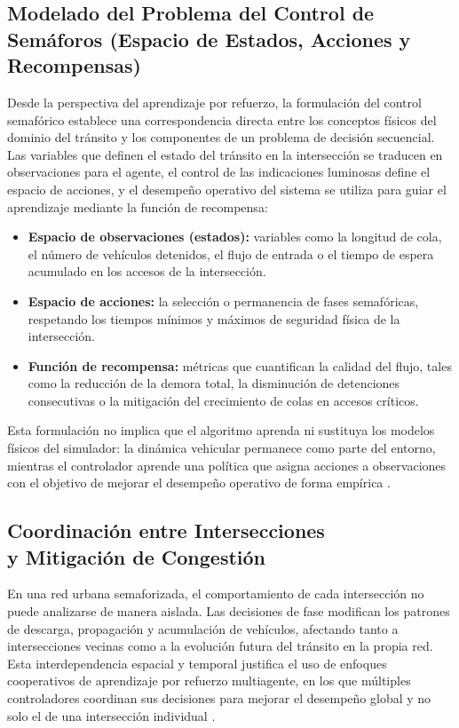 \subsection{Modelado del Problema del Control de Semáforos (Espacio de Estados, Acciones y Recompensas)}

Desde la perspectiva del aprendizaje por refuerzo, la formulación del control semafórico establece una correspondencia directa entre los conceptos físicos del dominio del tránsito y los componentes de un problema de decisión secuencial. Las variables que definen el estado del tránsito en la intersección se traducen en observaciones para el agente, el control de las indicaciones luminosas define el espacio de acciones, y el desempeño operativo del sistema se utiliza para guiar el aprendizaje mediante la función de recompensa:
\begin{itemize}
    \item \textbf{Espacio de observaciones (estados):} variables como la longitud de cola, el número de vehículos detenidos, el flujo de entrada o el tiempo de espera acumulado en los accesos de la intersección.
    \item \textbf{Espacio de acciones:} la selección o permanencia de fases semafóricas, respetando los tiempos mínimos y máximos de seguridad física de la intersección.
    \item \textbf{Función de recompensa:} métricas que cuantifican la calidad del flujo, tales como la reducción de la demora total, la disminución de detenciones consecutivas o la mitigación del crecimiento de colas en accesos críticos.
\end{itemize}
Esta formulación no implica que el algoritmo aprenda ni sustituya los modelos físicos del simulador: la dinámica vehicular permanece como parte del entorno, mientras el controlador aprende una política que asigna acciones a observaciones con el objetivo de mejorar el desempeño operativo de forma empírica \cite{WeiH2019ASTSCM,AlegreLSUMORLDoc,suttonRL}.

\subsection[Coordinación entre Intersecciones y Mitigación de Congestión]{Coordinación entre Intersecciones \\ y Mitigación de Congestión}

En una red urbana semaforizada, el comportamiento de cada intersección no puede analizarse de manera aislada. Las decisiones de fase modifican los patrones de descarga, propagación y acumulación de vehículos, afectando tanto a intersecciones vecinas como a la evolución futura del tránsito en la propia red. Esta interdependencia espacial y temporal justifica el uso de enfoques cooperativos de aprendizaje por refuerzo multiagente, en los que múltiples controladores coordinan sus decisiones para mejorar el desempeño global y no solo el de una intersección individual \cite{WeiH2019ASTSCM,gnn_traffic}.
